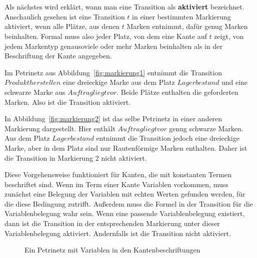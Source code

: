 	\\\\
	Als nächstes wird erklärt, wann man eine Transition als \textbf{aktiviert} bezeichnet. Anschaulich gesehen ist eine Transition $t$ in einer bestimmten Markierung aktiviert, wenn alle Plätze, aus denen $t$ Marken entnimmt, dafür genug Marken beinhalten.
	Formal muss also jeder Platz, von dem eine Kante auf $t$ zeigt, von jedem Markentyp genausoviele oder mehr Marken beinhalten als in der Beschriftung der Kante angegeben.

	Im Petrinetz aus Abbildung~\ref{fig:markierung1} entnimmt die Transition $Produkt herstellen$ eine dreieckige Marke aus dem Platz $Lagerbestand$ und eine schwarze Marke aus $Auftrag liegt vor$. Beide Plätze enthalten die geforderten Marken. Also ist die Transition aktiviert.

	In Abbildung~\ref{fig:markierung2} ist das selbe Petrinetz in einer anderen Markierung dargestellt. Hier enthält $Auftrag liegt vor$ genug schwarze Marken. Aus dem Platz $Lagerbestand$ entnimmt die Transition jedoch eine dreieckige Marke, aber in dem Platz sind nur Rautenförmige Marken enthalten. Daher ist die Transition in Markierung 2 nicht aktiviert.

	Diese Vorgehensweise funktioniert für Kanten, die mit konstanten Termen beschriftet sind. Wenn im Term einer Kante Variablen vorkommen, muss zunächst eine Belegung der Variablen mit echten Werten gefunden werden, für die diese Bedingung zutrifft. Außerdem muss die Formel in der Transition für die Variablenbelegung wahr sein. Wenn eine passende Variablenbelegung existiert, dann ist die Transition in der entsprechenden Markierung unter dieser Variablenbelegung aktiviert. Andernfalls ist die Transition nicht aktiviert.

	\begin{figure}[h]
		\centering
		\caption{Ein Petrinetz mit Variablen in den Kantenbeschriftungen}
		\label{fig:varkanten1}
	\end{figure}

